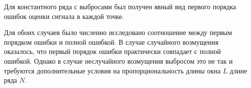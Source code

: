 \documentclass[specialist,
               substylefile = spbu.rtx,
               subf,href,colorlinks=true, 12pt]{disser}
\begin{document}
Для константного ряда с выбросами был получен явный вид первого порядка ошибок оценки сигнала в каждой точке.

Для обоих случаев было численно исследовано соотношение между первым порядком ошибки и полной ошибкой.
В случае случайного возмущения оказалось, что первый порядок ошибки практически совпадает с полной ошибкой. Однако в случае неслучайного возмущения выбросом это не так и требуются дополнительные условия на пропорциональность длины окна $L$ длине ряда $N$.




\end{document}
